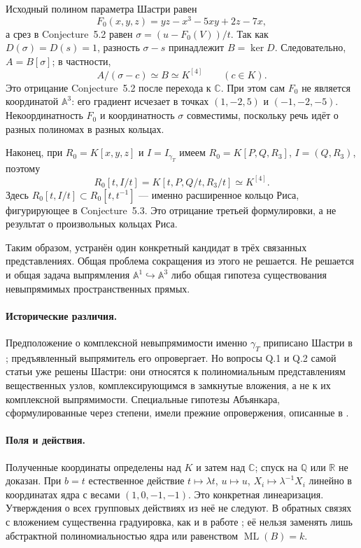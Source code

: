 Исходный полином параметра Шастри равен
\[
F_0(x,y,z)=yz-x^3-5xy+2z-7x,
\]
а срез в Conjecture~5.2 равен
$\sigma=(u-F_0(V))/t$. Так как $D(\sigma)=D(s)=1$,
разность $\sigma-s$ принадлежит $B=\ker D$.
Следовательно, $A=B[\sigma]$; в частности,
\[
A/(\sigma-c)\simeq B\simeq K^{[4]}\qquad(c\in K).
\]
Это отрицание Conjecture~5.2 после перехода к $\mathbb C$.
При этом сам $F_0$ не является координатой $\mathbb A^3$:
его градиент исчезает в точках $(1,-2,5)$ и $(-1,-2,-5)$.
Некоординатность $F_0$ и координатность $\sigma$ совместимы,
поскольку речь идёт о разных полиномах в разных кольцах.

Наконец, при $R_0=K[x,y,z]$ и $I=I_{\gamma_T}$ имеем
$R_0=K[P,Q,R_3]$, $I=(Q,R_3)$, поэтому
\[
R_0[t,I/t]=K[t,P,Q/t,R_3/t]\simeq K^{[4]}.
\]
Здесь $R_0[t,I/t]\subset R_0[t,t^{-1}]$ --- именно расширенное
кольцо Риса, фигурирующее в Conjecture~5.3. Это отрицание третьей
формулировки, а не результат о произвольных кольцах Риса.

Таким образом, устранён один конкретный кандидат в трёх связанных
представлениях. Общая проблема сокращения из этого не решается.
Не решается и общая задача выпрямления $\mathbb A^1\hookrightarrow
\mathbb A^3$ либо общая гипотеза существования невыпрямимых
пространственных прямых.

\paragraph{Исторические различия.}
Предположение о комплексной невыпрямимости именно $\gamma_T$
приписано Шастри в \cite[с.~1319]{vdER}; предъявленный выпрямитель
его опровергает. Но вопросы Q.1 и Q.2 самой статьи
\cite[с.~12]{Shastri} уже решены Шастри: они относятся к
полиномиальным представлениям вещественных узлов, комплексирующимся
в замкнутые вложения, а не к их комплексной выпрямимости.
Специальные гипотезы Абъянкара, сформулированные через степени,
имели прежние опровержения, описанные в
\cite[введение, с.~115--116]{Craighero}.

\paragraph{Поля и действия.}
Полученные координаты определены над $K$ и затем над $\mathbb C$;
спуск на $\mathbb Q$ или $\mathbb R$ не доказан.
При $b=t$ естественное действие
$t\mapsto\lambda t$, $u\mapsto u$, $X_i\mapsto\lambda^{-1}X_i$
линейно в координатах ядра с весами $(1,0,-1,-1)$.
Это конкретная линеаризация. Утверждения о всех групповых действиях
из неё не следуют. В обратных связях с вложением существенна
градуировка, как и в работе \cite{Masuda}; её нельзя заменять
лишь абстрактной полиномиальностью ядра или равенством $\operatorname{ML}(B)=k$.

